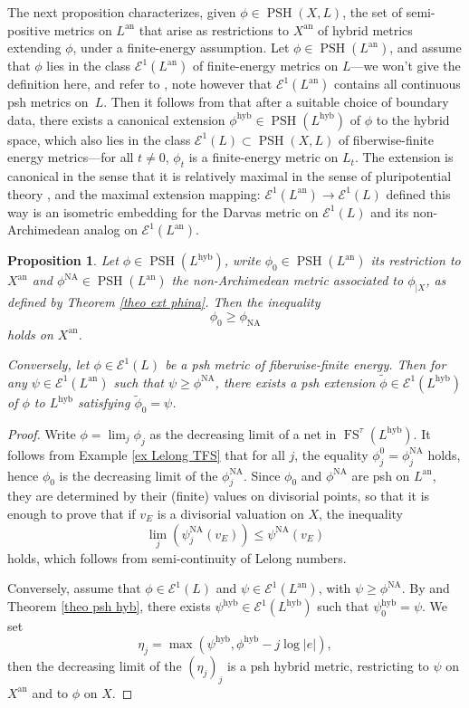 \documentclass[JEP,XML,SOM,Unicode,published]{cedram}
\newtheorem{prop}[equation]{Proposition}
\theoremstyle{definition}
\newcommand{\an}{\mathrm{an}}
\DeclareMathOperator{\FS}{FS}
\newcommand{\hyb}{\mathrm{hyb}}
\DeclareMathOperator{\NA}{NA}
\DeclareMathOperator{\PSH}{PSH}
\begin{document}
The next proposition characterizes, given $\phi \in \PSH(X, L)$, the set of semi-positive metrics on $L^{\an}$ that arise as restrictions to $X^{\an}$ of hybrid metrics extending $\phi$, under a finite-energy assumption. Let $\phi \in \PSH(L^{\an})$, and assume that $\phi$ lies in the class $\mathcal{E}^1(L^{\an})$ of finite-energy metrics on $L$---we won't give the definition here, and refer to \cite[\S6]{BFJ1}, note however that $\mathcal{E}^1(L^{\an})$ contains all continuous psh metrics on~$L$. Then it follows from \cite{Reb} that after a suitable choice of boundary data, there exists a canonical extension $\phi^{\hyb} \in \PSH(L^{\hyb})$ of $\phi$ to the hybrid space, which also lies in the class $\mathcal{E}^1(L) \subset \PSH(X,L)$ of fiberwise-finite energy metrics---for all $t \neq 0$, $\phi_t$ is a finite-energy metric on $L_t$. The extension is canonical in the sense that it is relatively maximal in the sense of pluripotential theory \cite{Klim}, and the maximal extension mapping: $\mathcal{E}^1(L^{\an}) \to \mathcal{E}^1(L)$ defined this way is an isometric embedding for the Darvas metric \cite{Dar} on $\mathcal{E}^1(L)$ and its non-Archimedean analog on $\mathcal{E}^1(L^{\an})$.
\begin{prop} \label{prop semic phina}
Let $\phi \in \PSH(L^{\hyb})$, write $\phi_0 \in \PSH(L^{\an})$ its restriction to $X^{\an}$ and $\phi^{\NA} \in \PSH(L^{\an})$ the non-Archimedean metric associated to $\phi_{| X}$, as defined by Theorem \ref{theo ext phina}. Then the inequality
\[
\phi_0 \ge \phi_{\NA}
\]
holds on $X^{\an}$.

Conversely, let $\phi \in \mathcal{E}^1(L)$ be a psh metric of fiberwise-finite energy. Then for any $\psi \in \mathcal{E}^1(L^{\an})$ such that $\psi \ge \phi^{\NA}$, there exists a psh extension $\tilde{\phi} \in \mathcal{E}^1(L^{\hyb})$ of $\phi$ to $L^{\hyb}$ satisfying $\tilde{\phi}_0 = \psi$.
\end{prop}
\begin{proof}
Write $\phi = \lim_j \phi_j$ as the decreasing limit of a net in $\FS^{\tau}(L^{\hyb})$. It follows from Example \ref{ex Lelong TFS} that for all $j$, the equality $\phi^0_j = \phi^{\NA}_j$ holds, hence $\phi_0$ is the decreasing limit of the $\phi^{\NA}_j$. Since $\phi_0$ and $\phi^{\NA}$ are psh on $L^{\an}$, they are determined by their (finite) values on divisorial points, so that it is enough to prove that if $v_E$ is a divisorial valuation on $X$, the inequality
\[
\lim_j (\psi^{\NA}_j(v_E)) \le \psi^{\NA}(v_E)
\]
holds, which follows from semi-continuity of Lelong numbers.

Conversely, assume that $\phi \in \mathcal{E}^1(L)$ and $\psi \in \mathcal{E}^1(L^{\an})$, with $\psi \ge \phi^{\NA}$. By \cite{Reb} and Theorem \ref{theo psh hyb}, there exists $\psi^{\hyb} \in \mathcal{E}^1(L^{\hyb})$ such that $\psi^{\hyb}_0 = \psi$. We set
\[
\eta_j = \max(\psi^{\hyb}, \phi^{\hyb} -j \log \lvert e \rvert),
\]
then the decreasing limit of the $(\eta_j)_j$ is a psh hybrid metric, restricting to $\psi$ on $X^{\an}$ and to $\phi$ on $X$.
\end{proof}
\end{document}
